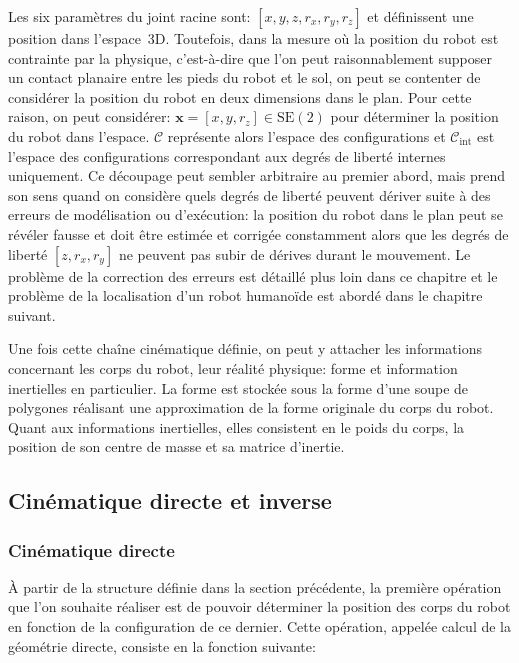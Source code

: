 Les six paramètres du joint racine sont: $[x, y, z, r_x, r_y, r_z]$ et
définissent une position dans l'espace 3D. Toutefois, dans la mesure
où la position du robot est contrainte par la physique, c'est-à-dire
que l'on peut raisonnablement supposer un contact planaire entre les
pieds du robot et le sol, on peut se contenter de considérer la
position du robot en deux dimensions dans le plan. Pour cette raison,
on peut considérer: $\mathbf{x} = [x, y, r_z] \in \text{SE}(2)$ pour
déterminer la position du robot dans l'espace. $\mathcal{C}$
représente alors l'espace des configurations et
$\mathcal{C}_{\text{int}}$ est l'espace des configurations
correspondant aux degrés de liberté internes uniquement. Ce découpage
peut sembler arbitraire au premier abord, mais prend son sens quand on
considère quels degrés de liberté peuvent dériver suite à des erreurs
de modélisation ou d'exécution: la position du robot dans le plan peut
se révéler fausse et doit être estimée et corrigée constamment alors
que les degrés de liberté $[z, r_x, r_y]$ ne peuvent pas subir de
dérives durant le mouvement. Le problème de la correction des erreurs
est détaillé plus loin dans ce chapitre et le problème de la
localisation d'un robot humanoïde est abordé dans le chapitre
suivant.


Une fois cette chaîne cinématique définie, on peut y attacher les
informations concernant les corps du robot, leur réalité physique:
forme et information inertielles en particulier. La forme est stockée
sous la forme d'une soupe de polygones réalisant une approximation de
la forme originale du corps du robot. Quant aux informations
inertielles, elles consistent en le poids du corps, la position de son
centre de masse et sa matrice d'inertie.


\subsection{Cinématique directe et inverse}

\subsubsection{Cinématique directe}

À partir de la structure définie dans la section précédente, la
première opération que l'on souhaite réaliser est de pouvoir
déterminer la position des corps du robot en fonction de la
configuration de ce dernier. Cette opération, appelée calcul de la
géométrie directe, consiste en la fonction suivante:

